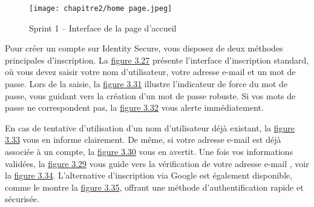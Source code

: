 \begin{figure}[H]
\centering
\texttt{[image: chapitre2/home page.jpeg]}
\caption{Sprint 1 – Interface de la page d'accueil}
\label{fig:3.27}

\end{figure}

Pour créer un compte sur Identity Secure, vous disposez de deux méthodes principales d'inscription. La \hyperref[fig:3.28]{figure 3.27} présente l'interface d'inscription standard, où vous devez saisir votre nom d'utilisateur, votre adresse e-mail et un mot de passe. Lors de la saisie, la \hyperref[fig:3.31]{figure 3.31} illustre l'indicateur de force du mot de passe, vous guidant vers la création d'un mot de passe robuste. Si vos mots de passe ne correspondent pas, la \hyperref[fig:3.32]{figure 3.32} vous alerte immédiatement.

En cas de tentative d'utilisation d'un nom d'utilisateur déjà existant, la \hyperref[fig:3.33]{figure 3.33} vous en informe clairement. De même, si votre adresse e-mail est déjà associée à un compte, la \hyperref[fig:3.30]{figure 3.30} vous en avertit. Une fois vos informations validées, la \hyperref[fig:3.29]{figure 3.29} vous guide vers la vérification de votre adresse e-mail , voir la \hyperref[fig:3.34]{figure 3.34}. L'alternative d'inscription via Google est également disponible, comme le montre la \hyperref[fig:3.35]{figure 3.35}, offrant une méthode d'authentification rapide et sécurisée.

